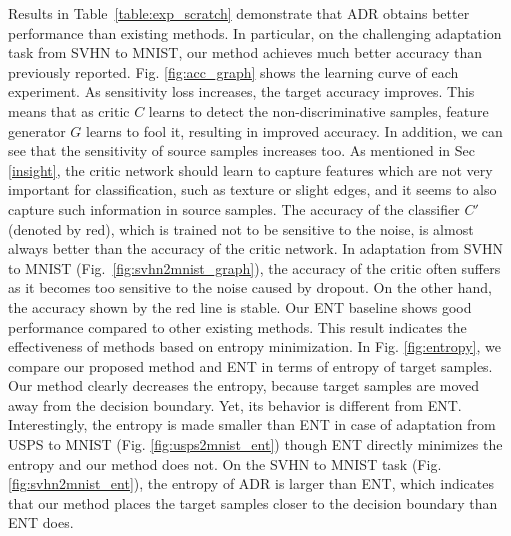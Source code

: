 \documentclass{article} \usepackage{iclr2018_conference,times}
\begin{document}
Results in Table~\ref{table:exp_scratch} demonstrate that ADR obtains better performance than existing methods. In particular, on the challenging adaptation task from SVHN to MNIST, our method achieves much better accuracy than previously reported. Fig. \ref{fig:acc_graph} shows the learning curve of each experiment. As sensitivity loss increases, the target accuracy improves. This means that as critic $C$ learns to detect the non-discriminative samples, feature generator $G$ learns to fool it, resulting in improved accuracy.
In addition, we can see that the sensitivity of source samples increases too. As mentioned in Sec \ref{insight}, the critic network should learn to capture features which are not very important for classification, such as texture or slight edges, and it seems to also capture such information in source samples.
The accuracy of the classifier $C'$ (denoted by red), which is trained not to be sensitive to the noise, is almost always better than the accuracy of the critic network. In adaptation from SVHN to MNIST (Fig.~\ref{fig:svhn2mnist_graph}), the accuracy of the critic often suffers as it becomes too sensitive to the noise caused by dropout. On the other hand, the accuracy shown by the red line is stable. Our ENT baseline shows good performance compared to other existing methods. This result indicates the effectiveness of methods based on entropy minimization. In Fig. \ref{fig:entropy}, we compare our proposed method and ENT in terms of entropy of target samples. Our method clearly decreases the entropy, because target samples are moved away from the decision boundary. Yet, its behavior is different from ENT. 
Interestingly, the entropy is made smaller than ENT in case of adaptation from USPS to MNIST (Fig. \ref{fig:usps2mnist_ent}) though ENT directly minimizes the entropy and our method does not. On the SVHN to MNIST task (Fig. \ref{fig:svhn2mnist_ent}), the entropy of ADR is larger than ENT, which indicates that our method places the target samples closer to the decision boundary than ENT does. 
\end{document}
